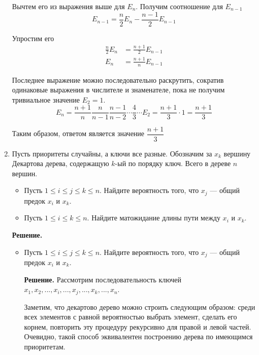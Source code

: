 \begin{enumerate}
	Вычтем его из выражения выше для $E_n$. Получим соотношение для $E_{n - 1}$
	\begin{equation*}
	E_{n - 1} = \frac{n}{2} E_{n} - \frac{n - 1}{2} E_{n - 1}
	\end{equation*}
	
	Упростим его
	\begin{align*}
	\frac{n}{2} E_n &= \frac{n + 1}{2}E_{n - 1} \\
	E_n &= \frac{n + 1}{n} E_{n - 1}
	\end{align*}
	
	Последнее выражение можно последовательно раскрутить, сократив одинаковые выражения в числителе и знаменателе, пока не получим тривиальное значение $E_2 = 1$.
	\begin{equation*}
	E_n = \frac{n + 1}{n} \frac{n}{n - 1} \frac{n - 1}{n - 2} \cdots \frac{4}{3} \cdots E_2 = \frac{n + 1}{3} \cdot 1 = \frac{n + 1}{3}
	\end{equation*}
	
	Таким образом, ответом является значение $\dfrac{n + 1}{3}$
	
	\item Пусть приоритеты случайны, а ключи все разные. Обозначим за $x_k$ вершину Декартова дерева,	
	содержащую $k$-ый по порядку ключ. Всего в дереве $n$ вершин.
	\begin{itemize}
		\item Пусть $1 \leqslant i \leqslant j \leqslant k \leqslant n$. Найдите вероятность того, что $x_j$ — 
		общий предок $x_i$ и $x_k$.
		\item Пусть $1 \leqslant i \leqslant k \leqslant n$. Найдите матожидание длины пути между $x_i$ и $x_k$.
	\end{itemize}
	
	\textbf{Решение.}
	
	\begin{itemize}
		\item Пусть $1 \leqslant i \leqslant j \leqslant k \leqslant n$. Найдите вероятность того, что $x_j$ — 
		общий предок $x_i$ и $x_k$.
		
		\textbf{Решение.} Рассмотрим последовательность ключей $x_1, x_2, ..., x_i, ..., x_j,..., x_k, ..., x_n$.
		
		Заметим, что декартово дерево можно строить следующим образом: среди всех элементов с равной вероятностью 
		выбрать элемент, сделать его корнем, повторить эту процедуру рекурсивно для правой и левой частей. 
		Очевидно, такой способ эквивалентен построению дерева по имеющимся приоритетам.
		

\end{itemize}
\end{enumerate}
